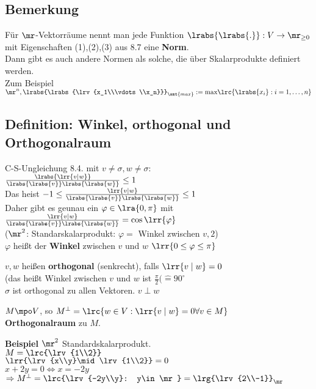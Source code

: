 \subsection{Bemerkung}
	Für $\mr$-Vektorräume nennt man jede Funktion $\lrabs{\lrabs{.}}:V\rightarrow\mr_{\geq 0}$ mit Eigenschaften (1),(2),(3) aus 8.7 eine \textbf{Norm}.\\
	Dann gibt es auch andere Normen als solche, die über Skalarprodukte definiert werden.\\
	Zum Beispiel $\mr^n, \lrabs{\lrabs{\lrv{x_1\\\vdots\\x_n}}}_{\smt{max}}:=\mbox{max}\lrc{\lrabs{x_i}:i=1,\dots,n}$

\subsection{Definition: Winkel, orthogonal und Orthogonalraum}
		\item C-S-Ungleichung 8.4. mit $v\neq\sigma, w\neq\sigma$:\\
			$\frac{\lrabs{\lrr{v\mid w}}}{\lrabs{\lrabs{v}}\lrabs{\lrabs{w}}}\leq 1$\\
			Das heist $-1\leq\frac{\lrr{v\mid w}}{\lrabs{\lrabs{v}}\lrabs{\lrabs{w}}}\leq 1$\\
			Daher gibt es geunau ein $\varphi\in\lra{0,\pi}$ mit $\frac{\lrr{v\mid w}}{\lrabs{\lrabs{v}}\lrabs{\lrabs{w}}}=\cos\lrr{\varphi}$\\
			($\mr^2$: Standarskalarprodukt: $\varphi=$ Winkel zwischen $v,2$)\\
			$\varphi$ heißt der \textbf{Winkel} zwischen $v$ und $w$ $\lrr{0\leq\varphi\leq\pi}$
		\item $v,w$ heißen \textbf{orthogonal} (senkrecht), falls $\lrr{v\mid w}=0$\\
			(das heißt Winkel zwischen $v$ und $w$ ist $\frac{\pi}{2}(\hat{=}90^\circ$\\
			$\sigma$ ist orthogonal zu allen Vektoren. $v \perp w$
		\item $M\mpo V$, so $M^\perp=\lrc{w\in V:\lrr{v\mid w}=0\forall v\in M}$\\
			\textbf{Orthogonalraum} zu $M$.

			\textbf{Beispiel} $\mr^2$ Standardskalarprodukt.\\
				$M=\lrc{\lrv{1\\2}}$\\
				$\lrr{\lrv{x\\y}\mid\lrv{1\\2}}=0$\\
				$x+2y=0\Leftrightarrow x=-2y$\\
				$\Rightarrow M^\perp=\lrc{\lrv{-2y\\y}: y\in\mr}=\lrg{\lrv{2\\-1}}_\mr$
	\subExEnd

